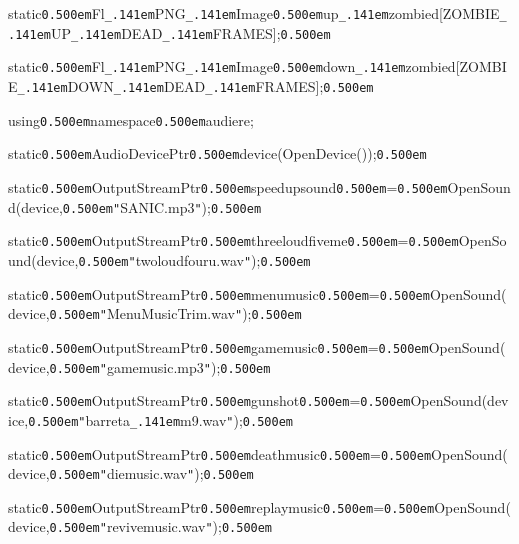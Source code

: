 \documentclass[12pt]{article}
\begin{document}
\noindent
{}static{\tt\mc \kern0.500em}Fl{\tt\_\kern.141em}PNG{\tt\_\kern.141em}Image{\tt *}{\tt\mc \kern0.500em}up{\tt\_\kern.141em}zombied[ZOMBIE{\tt\_\kern.141em}UP{\tt\_\kern.141em}DEAD{\tt\_\kern.141em}FRAMES];{\tt\mc \kern0.500em}

\noindent
{}static{\tt\mc \kern0.500em}Fl{\tt\_\kern.141em}PNG{\tt\_\kern.141em}Image{\tt *}{\tt\mc \kern0.500em}down{\tt\_\kern.141em}zombied[ZOMBIE{\tt\_\kern.141em}DOWN{\tt\_\kern.141em}DEAD{\tt\_\kern.141em}FRAMES];{\tt\mc \kern0.500em}

\noindent
{}using{\tt\mc \kern0.500em}namespace{\tt\mc \kern0.500em}audiere;

\noindent
{}static{\tt\mc \kern0.500em}AudioDevicePtr{\tt\mc \kern0.500em}device(OpenDevice());{\tt\mc \kern0.500em}

\noindent
{}static{\tt\mc \kern0.500em}OutputStreamPtr{\tt\mc \kern0.500em}speedupsound{\tt\mc \kern0.500em}={\tt\mc \kern0.500em}OpenSound(device,{\tt\mc \kern0.500em}{\tt "}SANIC.mp3{\tt "});{\tt\mc \kern0.500em}

\noindent
{}static{\tt\mc \kern0.500em}OutputStreamPtr{\tt\mc \kern0.500em}threeloudfiveme{\tt\mc \kern0.500em}={\tt\mc \kern0.500em}OpenSound(device,{\tt\mc \kern0.500em}{\tt "}twoloudfouru.wav{\tt "});{\tt\mc \kern0.500em}

\noindent
{}static{\tt\mc \kern0.500em}OutputStreamPtr{\tt\mc \kern0.500em}menumusic{\tt\mc \kern0.500em}={\tt\mc \kern0.500em}OpenSound(device,{\tt\mc \kern0.500em}{\tt "}MenuMusicTrim.wav{\tt "});{\tt\mc \kern0.500em}

\noindent
{}static{\tt\mc \kern0.500em}OutputStreamPtr{\tt\mc \kern0.500em}gamemusic{\tt\mc \kern0.500em}={\tt\mc \kern0.500em}OpenSound(device,{\tt\mc \kern0.500em}{\tt "}gamemusic.mp3{\tt "});{\tt\mc \kern0.500em}

\noindent
{}static{\tt\mc \kern0.500em}OutputStreamPtr{\tt\mc \kern0.500em}gunshot{\tt\mc \kern0.500em}={\tt\mc \kern0.500em}OpenSound(device,{\tt\mc \kern0.500em}{\tt "}barreta{\tt\_\kern.141em}m9.wav{\tt "});{\tt\mc \kern0.500em}

\noindent
{}static{\tt\mc \kern0.500em}OutputStreamPtr{\tt\mc \kern0.500em}deathmusic{\tt\mc \kern0.500em}={\tt\mc \kern0.500em}OpenSound(device,{\tt\mc \kern0.500em}{\tt "}diemusic.wav{\tt "});{\tt\mc \kern0.500em}

\noindent
{}static{\tt\mc \kern0.500em}OutputStreamPtr{\tt\mc \kern0.500em}replaymusic{\tt\mc \kern0.500em}={\tt\mc \kern0.500em}OpenSound(device,{\tt\mc \kern0.500em}{\tt "}revivemusic.wav{\tt "});{\tt\mc \kern0.500em}
\end{document}
